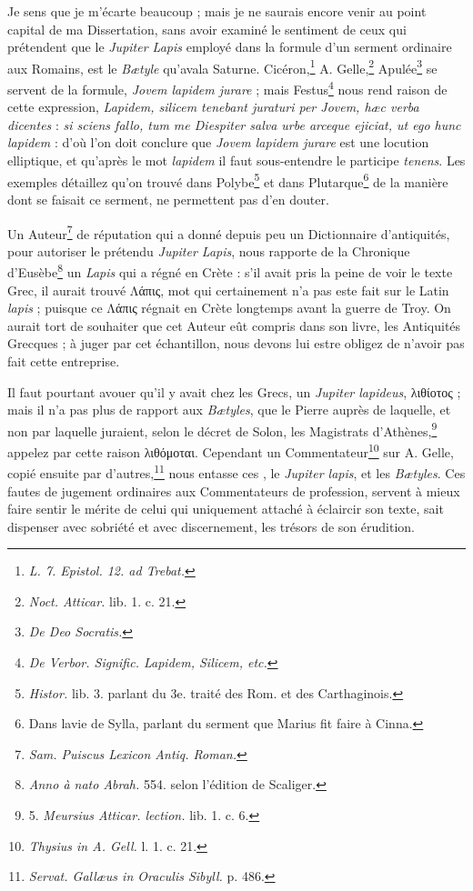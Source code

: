 \documentclass[a4paper, 11pt, oneside, polutonikogreek, french]{article}
\begin{document}
Je sens que je m'écarte beaucoup ; mais je ne saurais encore venir au point capital de ma Dissertation, sans avoir examiné le sentiment de ceux qui prétendent que le \emph{Jupiter Lapis} employé dans la formule d'un serment ordinaire aux Romains, est le \emph{Bætyle} qu'avala Saturne. Cicéron,\footnote{\emph{L. 7. Epistol. 12. ad Trebat.}} A. Gelle,\footnote{\emph{Noct. Atticar.} lib. 1. c. 21.} Apulée\footnote{\emph{De Deo Socratis.}} se servent de la formule, \emph{Jovem lapidem jurare} ; mais Festus\footnote{\emph{De Verbor. Signific. Lapidem, Silicem, etc.}} nous rend raison de cette expression, \emph{Lapidem, silicem tenebant juraturi per Jovem, hæc verba dicentes} : \emph{si sciens fallo, tum me Diespiter salva urbe arceque ejiciat, ut ego hunc lapidem} : d'où l'on doit conclure que \emph{Jovem lapidem jurare} est une locution elliptique, et qu'après le mot \emph{lapidem} il faut sous-entendre le participe \emph{tenens}. Les exemples détaillez qu'on trouvé dans Polybe\footnote{\emph{Histor.} lib. 3. parlant du 3e. traité des Rom. et des Carthaginois.} et dans Plutarque\footnote{Dans lavie de Sylla, parlant du serment que Marius fit faire à Cinna.} de la manière dont se faisait ce serment, ne permettent pas d'en douter.

Un Auteur\footnote{\emph{Sam. Puiscus Lexicon Antiq. Roman.}} de réputation qui a donné depuis peu un Dictionnaire d'antiquités, pour autoriser le prétendu \emph{Jupiter Lapis}, nous rapporte de la Chronique d'Eusèbe\footnote{\emph{Anno à nato Abrah.} 554. selon l'édition de Scaliger.} un \emph{Lapis} qui a régné en Crète : s'il avait pris la peine de voir le texte Grec, il aurait trouvé Λάπις, mot qui certainement n'a pas este fait sur le Latin \emph{lapis} ; puisque ce Λάπις régnait en Crète longtemps avant la guerre de Troy. On aurait tort de souhaiter que cet Auteur eût compris dans son livre, les Antiquités Grecques ; à juger par cet échantillon, nous devons lui estre obligez de n'avoir pas fait cette entreprise.

Il faut pourtant avouer qu'il y avait chez les Grecs, un \emph{Jupiter lapideus}, λιθίοτος ; mais il n'a pas plus de rapport aux \emph{Bætyles}, que le Pierre auprès de laquelle, et non par laquelle juraient, selon le décret de Solon, les Magistrats d'Athènes,\footnote{5. \emph{Meursius Atticar. lection.} lib. 1. c. 6.} appelez par cette raison λιθόμοται. Cependant un Commentateur\footnote{\emph{Thysius in A. Gell.} l. 1. c. 21.} sur A. Gelle, copié ensuite par d'autres,\footnote{\emph{Servat. Gallæus in Oraculis Sibyll.} p. 486.} nous entasse ces , le \emph{Jupiter lapis}, et les \emph{Bætyles}. Ces fautes de jugement ordinaires aux Commentateurs de profession, servent à mieux faire sentir le mérite de celui qui uniquement attaché à éclaircir son texte, sait dispenser avec sobriété et avec discernement, les trésors de son érudition.
\end{document}

